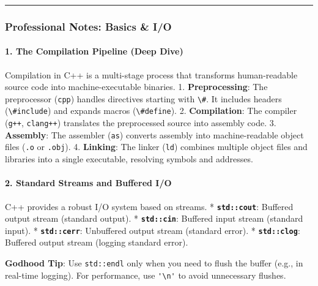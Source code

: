 \begin{center}\rule{0.5\linewidth}{0.5pt}\end{center}

\hypertarget{professional-notes-basics-io}{%
\subsubsection{Professional Notes: Basics \&
I/O}\label{professional-notes-basics-io}}

\hypertarget{the-compilation-pipeline-deep-dive}{%
\paragraph{1. The Compilation Pipeline (Deep
Dive)}\label{the-compilation-pipeline-deep-dive}}

Compilation in C++ is a multi-stage process that transforms
human-readable source code into machine-executable binaries. 1.
\textbf{Preprocessing}: The preprocessor (\passthrough{\lstinline!cpp!})
handles directives starting with \passthrough{\lstinline!\#!}. It
includes headers (\passthrough{\lstinline!\#include!}) and expands
macros (\passthrough{\lstinline!\#define!}). 2. \textbf{Compilation}:
The compiler (\passthrough{\lstinline!g++!},
\passthrough{\lstinline!clang++!}) translates the preprocessed source
into assembly code. 3. \textbf{Assembly}: The assembler
(\passthrough{\lstinline!as!}) converts assembly into machine-readable
object files (\passthrough{\lstinline!.o!} or
\passthrough{\lstinline!.obj!}). 4. \textbf{Linking}: The linker
(\passthrough{\lstinline!ld!}) combines multiple object files and
libraries into a single executable, resolving symbols and addresses.

\hypertarget{standard-streams-and-buffered-io}{%
\paragraph{2. Standard Streams and Buffered
I/O}\label{standard-streams-and-buffered-io}}

C++ provides a robust I/O system based on streams. *
\textbf{\passthrough{\lstinline!std::cout!}}: Buffered output stream
(standard output). * \textbf{\passthrough{\lstinline!std::cin!}}:
Buffered input stream (standard input). *
\textbf{\passthrough{\lstinline!std::cerr!}}: Unbuffered output stream
(standard error). * \textbf{\passthrough{\lstinline!std::clog!}}:
Buffered output stream (logging standard error).

\textbf{Godhood Tip}: Use \passthrough{\lstinline!std::endl!} only when
you need to flush the buffer (e.g., in real-time logging). For
performance, use \passthrough{\lstinline!'\\n'!} to avoid unnecessary
flushes.

